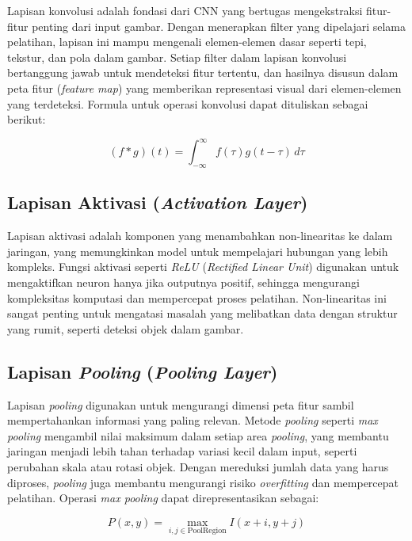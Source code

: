 Lapisan konvolusi adalah fondasi dari CNN yang bertugas mengekstraksi fitur-fitur penting dari input gambar. Dengan menerapkan filter yang dipelajari selama pelatihan, lapisan ini mampu mengenali elemen-elemen dasar seperti tepi, tekstur, dan pola dalam gambar. Setiap filter dalam lapisan konvolusi bertanggung jawab untuk mendeteksi fitur tertentu, dan hasilnya disusun dalam peta fitur (\emph{feature map}) yang memberikan representasi visual dari elemen-elemen yang terdeteksi. Formula untuk operasi konvolusi dapat dituliskan sebagai berikut:

\begin{equation}
  (f * g)(t) = \int_{-\infty}^{\infty} f(\tau)g(t - \tau) \, d\tau
\end{equation}

\subsection{Lapisan Aktivasi (\emph{Activation Layer})}
\label{subsec:Activation Layer}

Lapisan aktivasi adalah komponen yang menambahkan non-linearitas ke dalam jaringan, yang memungkinkan model untuk mempelajari hubungan yang lebih kompleks. Fungsi aktivasi seperti \emph{ReLU} (\emph{Rectified Linear Unit}) digunakan untuk mengaktifkan neuron hanya jika outputnya positif, sehingga mengurangi kompleksitas komputasi dan mempercepat proses pelatihan. Non-linearitas ini sangat penting untuk mengatasi masalah yang melibatkan data dengan struktur yang rumit, seperti deteksi objek dalam gambar.

\subsection{Lapisan \emph{Pooling} (\emph{Pooling Layer})}
\label{subsec:Pooling Layer}

Lapisan \emph{pooling} digunakan untuk mengurangi dimensi peta fitur sambil mempertahankan informasi yang paling relevan. Metode \emph{pooling} seperti \emph{max pooling} mengambil nilai maksimum dalam setiap area \emph{pooling}, yang membantu jaringan menjadi lebih tahan terhadap variasi kecil dalam input, seperti perubahan skala atau rotasi objek. Dengan mereduksi jumlah data yang harus diproses, \emph{pooling} juga membantu mengurangi risiko \emph{overfitting} dan mempercepat pelatihan. Operasi \emph{max pooling} dapat direpresentasikan sebagai:

\begin{equation}
  P(x, y) = \max_{i,j \in \mathrm{PoolRegion}} I(x+i, y+j)
\end{equation}

